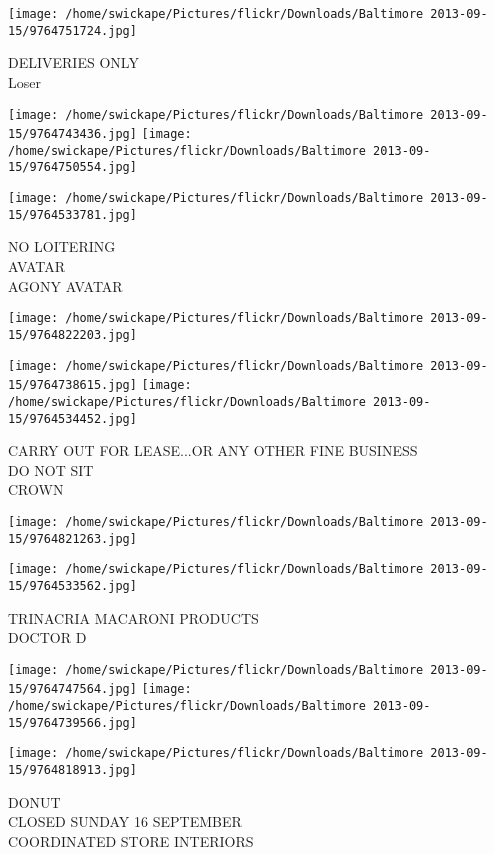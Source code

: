 \documentclass[10pt,letterpaper]{article}
\begin{document}
\vspace{0.25in}
\texttt{[image: /home/swickape/Pictures/flickr/Downloads/Baltimore 2013-09-15/9764751724.jpg]}

DELIVERIES ONLY\\
Loser
\pagebreak

\texttt{[image: /home/swickape/Pictures/flickr/Downloads/Baltimore 2013-09-15/9764743436.jpg]}
\texttt{[image: /home/swickape/Pictures/flickr/Downloads/Baltimore 2013-09-15/9764750554.jpg]}

\texttt{[image: /home/swickape/Pictures/flickr/Downloads/Baltimore 2013-09-15/9764533781.jpg]}

NO LOITERING\\
AVATAR\\
AGONY AVATAR
\pagebreak

\texttt{[image: /home/swickape/Pictures/flickr/Downloads/Baltimore 2013-09-15/9764822203.jpg]}

\vspace{0.25in}
\texttt{[image: /home/swickape/Pictures/flickr/Downloads/Baltimore 2013-09-15/9764738615.jpg]}
\texttt{[image: /home/swickape/Pictures/flickr/Downloads/Baltimore 2013-09-15/9764534452.jpg]}

CARRY OUT FOR LEASE...OR ANY OTHER FINE BUSINESS\\
DO NOT SIT\\
CROWN
\pagebreak

\texttt{[image: /home/swickape/Pictures/flickr/Downloads/Baltimore 2013-09-15/9764821263.jpg]}

\vspace{0.25in}
\texttt{[image: /home/swickape/Pictures/flickr/Downloads/Baltimore 2013-09-15/9764533562.jpg]}

TRINACRIA MACARONI PRODUCTS\\
DOCTOR D
\pagebreak

\texttt{[image: /home/swickape/Pictures/flickr/Downloads/Baltimore 2013-09-15/9764747564.jpg]}
\texttt{[image: /home/swickape/Pictures/flickr/Downloads/Baltimore 2013-09-15/9764739566.jpg]}

\vspace{0.25in}
\texttt{[image: /home/swickape/Pictures/flickr/Downloads/Baltimore 2013-09-15/9764818913.jpg]}

DONUT\\
CLOSED SUNDAY 16 SEPTEMBER\\
COORDINATED STORE INTERIORS
\pagebreak
\end{document}
